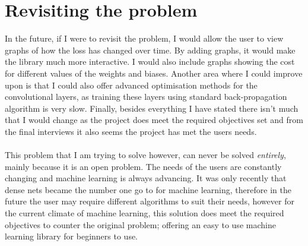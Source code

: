 \section{Revisiting the problem}
In the future, if I were to revisit the problem, I would allow the user to view graphs of how the loss has changed over time. By adding graphs, it would make the library much more interactive. I would also include graphs showing the cost for different values of the weights and biases. Another area where I could improve upon is that I could also offer advanced optimisation methods for the convolutional layers, as training these layers using standard back-propagation algorithm is very slow. Finally, besides everything I have stated there isn't much that I would change as the project does meet the required objectives set and from the final interviews it also seems the project has met the users needs.
\\ \\
This problem that I am trying to solve however, can never be solved \textit{entirely}, mainly because it is an open problem. The needs of the users are constantly changing and machine learning is always advancing. It was only recently that dense nets became the number one go to for machine learning, therefore in the future the user may require different algorithms to suit their needs, however for the current climate of machine learning, this solution does meet the required objectives to counter the original problem; offering an easy to use machine learning library for beginners to use.